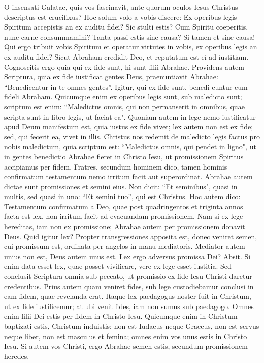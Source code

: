 \begin{biblechapter} 
\verse O insensati Galatae, quis vos fascinavit, ante quorum oculos Iesus Christus descriptus est crucifixus? 
\verse Hoc solum volo a vobis discere: Ex operibus legis Spiritum accepistis an ex auditu fidei? 
\verse Sic stulti estis? Cum Spiritu coeperitis, nunc carne consummamini? 
\verse Tanta passi estis sine causa? Si tamen et sine causa! 
\verse Qui ergo tribuit vobis Spiritum et operatur virtutes in vobis, ex operibus legis an ex auditu fidei? 
\verse Sicut Abraham credidit Deo, et reputatum est ei ad iustitiam. 
\verse Cognoscitis ergo quia qui ex fide sunt, hi sunt filii Abrahae. 
\verse Providens autem Scriptura, quia ex fide iustificat gentes Deus, praenuntiavit Abrahae: “Benedicentur in te omnes gentes”. 
\verse Igitur, qui ex fide sunt, benedi cuntur cum fideli Abraham. 
\verse Quicumque enim ex operibus legis sunt, sub maledicto sunt; scriptum est enim: “Maledictus omnis, qui non permanserit in omnibus, quae scripta sunt in libro legis, ut faciat ea". 
\verse Quoniam autem in lege nemo iustificatur apud Deum manifestum est, quia iustus ex fide vivet; 
\verse lex autem non est ex fide; sed, qui fecerit ea, vivet in illis. 
\verse Christus nos redemit de maledicto legis factus pro nobis maledictum, quia scriptum est: “Maledictus omnis, qui pendet in ligno", 
\verse ut in gentes benedictio Abrahae fieret in Christo Iesu, ut promissionem Spiritus accipiamus per fidem. 
\verse Fratres, secundum hominem dico, tamen hominis confirmatum testamentum nemo irritum facit aut superordinat. 
\verse Abrahae autem dictae sunt promissiones et semini eius. Non dicit: “Et seminibus", quasi in multis, sed quasi in uno: “Et semini tuo”, qui est Christus. 
\verse Hoc autem dico: Testamentum confirmatum a Deo, quae post quadringentos et triginta annos facta est lex, non irritum facit ad evacuandam promissionem. 
\verse Nam si ex lege hereditas, iam non ex promissione; Abrahae autem per promissionem donavit Deus. 
\verse Quid igitur lex? Propter transgressiones apposita est, donec veniret semen, cui promissum est, ordinata per angelos in manu mediatoris. 
\verse Mediator autem unius non est, Deus autem unus est. 
\verse Lex ergo adversus promissa Dei? Absit. Si enim data esset lex, quae posset vivificare, vere ex lege esset iustitia. 
\verse Sed conclusit Scriptura omnia sub peccato, ut promissio ex fide Iesu Christi daretur credentibus. 
\verse Prius autem quam veniret fides, sub lege custodiebamur conclusi in eam fidem, quae revelanda erat. 
\verse Itaque lex paedagogus noster fuit in Christum, ut ex fide iustificemur; 
\verse at ubi venit fides, iam non sumus sub paedagogo.  
\verse Omnes enim filii Dei estis per fidem in Christo Iesu. 
\verse Quicumque enim in Christum baptizati estis, Christum induistis: 
\verse non est Iudaeus neque Graecus, non est servus neque liber, non est masculus et femina; omnes enim vos unus estis in Christo Iesu. 
\verse Si autem vos Christi, ergo Abrahae semen estis, secundum promissionem heredes. 
\end{biblechapter}

